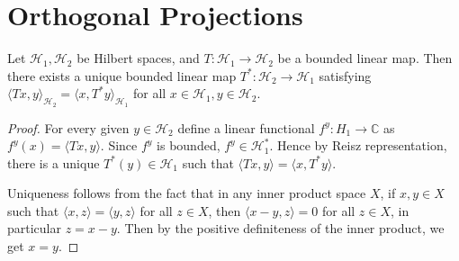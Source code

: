 \section{Orthogonal Projections}

\begin{theorem}
  Let $\mathcal{H}_1, \mathcal{H}_2$ be Hilbert spaces, and $T:
  \mathcal{H}_1 \to  \mathcal{H}_2$ be a bounded
  linear map. Then there exists a unique bounded linear map $T^*: \mathcal{H}_2
  \to \mathcal{H}_1$ satisfying $\langle  Tx , y
  \rangle_{\mathcal{H}_2} = \langle x ,
  T^*y \rangle_{\mathcal{H}_1}$ for all $x \in \mathcal{H}_1, y \in
  \mathcal{H}_2$.
\end{theorem}
\begin{proof}
  For every given $y \in \mathcal{H}_2$ define a linear functional $f^y: H_1
  \to \mathbb{C}$ as $f^y(x) = \langle Tx , y \rangle$. Since $f^{y}$
  is bounded, $f^y \in \mathcal{H}_1^*$. Hence by Reisz representation, there
  is a unique $T^*(y) \in \mathcal{H}_1$ such that $\langle  Tx , y \rangle =
  \langle x , T^*y \rangle$.

  Uniqueness follows from the fact that in any inner product space
  $X$, if $x, y \in X$ such that $ \langle x , z \rangle = \langle  y
  , z \rangle $ for all $z \in X$, then $\langle  x-y , z \rangle =
  0$ for all $z \in X$, in particular $z = x-y$. Then by the positive
  definiteness of the inner product, we get $x = y$.
\end{proof}


